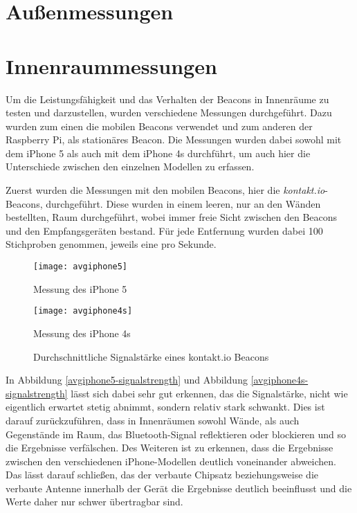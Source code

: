 \section{Außenmessungen}
\label{sec:dataandmeasurement:outdoormeasure}

\section{Innenraummessungen}
\label{sec:dataandmeasurement:indoormeasure}
Um die Leistungsfähigkeit und das Verhalten der Beacons in Innenräume zu testen und darzustellen, wurden verschiedene Messungen durchgeführt. Dazu wurden zum einen die mobilen Beacons verwendet und zum anderen der Raspberry Pi, als stationäres Beacon.
Die Messungen wurden dabei sowohl mit dem iPhone 5 als auch mit dem iPhone 4s durchführt, um auch hier die Unterschiede zwischen den einzelnen Modellen zu erfassen.


Zuerst wurden die Messungen mit den mobilen Beacons, hier die \emph{kontakt.io}-Beacons, durchgeführt.
Diese wurden in einem leeren, nur an den Wänden bestellten, Raum durchgeführt, wobei immer freie Sicht zwischen den Beacons und den Empfangsgeräten bestand. Für jede Entfernung wurden dabei 100 Stichproben genommen, jeweils eine pro Sekunde.
\begin{figure}[h!]
	\centering
	\begin{minipage}[t]{5cm}
		\texttt{[image: avgiphone5]}
		\caption{Messung des iPhone 5}
		\label{avgiphone5-signalstrength}
	\end{minipage}
	\hspace{2cm}
	\begin{minipage}[t]{5cm}
			\texttt{[image: avgiphone4s]}
			\caption{Messung des iPhone 4s}
			\label{avgiphone4s-signalstrength}
	\end{minipage}
		\caption{Durchschnittliche Signalstärke eines kontakt.io Beacons}
		\label{signalstrength}
\end{figure}

In Abbildung \ref{avgiphone5-signalstrength} und Abbildung \ref{avgiphone4s-signalstrength} lässt sich dabei sehr gut erkennen, das die Signalstärke, nicht wie eigentlich erwartet stetig abnimmt, sondern relativ stark schwankt. Dies ist darauf zurückzuführen, dass in Innenräumen sowohl Wände, als auch Gegenstände im Raum, das Bluetooth-Signal reflektieren oder blockieren und so die Ergebnisse verfälschen.
Des Weiteren ist zu erkennen, dass die Ergebnisse zwischen den verschiedenen iPhone-Modellen deutlich voneinander abweichen. Das lässt darauf schließen, das der verbaute Chipsatz beziehungsweise die verbaute Antenne innerhalb der Gerät die Ergebnisse deutlich beeinflusst und die Werte daher nur schwer übertragbar sind.


